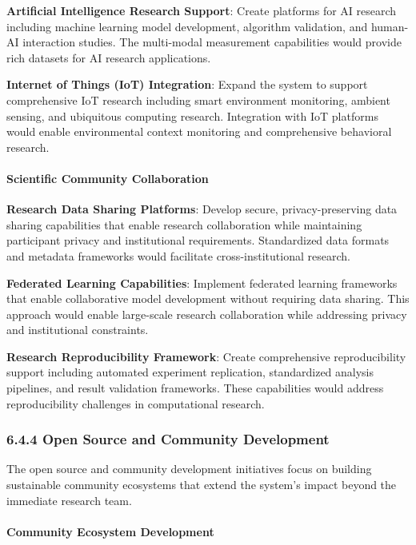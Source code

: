 \documentclass[12pt,a4paper]{article}
\begin{document}
\textbf{Artificial Intelligence Research Support}: Create platforms for AI research including machine learning model
development, algorithm validation, and human-AI interaction studies. The multi-modal measurement capabilities would
provide rich datasets for AI research applications.

\textbf{Internet of Things (IoT) Integration}: Expand the system to support comprehensive IoT research including smart
environment monitoring, ambient sensing, and ubiquitous computing research. Integration with IoT platforms would enable
environmental context monitoring and comprehensive behavioral research.

\paragraph{Scientific Community Collaboration}

\textbf{Research Data Sharing Platforms}: Develop secure, privacy-preserving data sharing capabilities that enable research
collaboration while maintaining participant privacy and institutional requirements. Standardized data formats and
metadata frameworks would facilitate cross-institutional research.

\textbf{Federated Learning Capabilities}: Implement federated learning frameworks that enable collaborative model development
without requiring data sharing. This approach would enable large-scale research collaboration while addressing privacy
and institutional constraints.

\textbf{Research Reproducibility Framework}: Create comprehensive reproducibility support including automated experiment
replication, standardized analysis pipelines, and result validation frameworks. These capabilities would address
reproducibility challenges in computational research.

\subsubsection{6.4.4 Open Source and Community Development}

The open source and community development initiatives focus on building sustainable community ecosystems that extend the
system's impact beyond the immediate research team.

\paragraph{Community Ecosystem Development}
\end{document}
